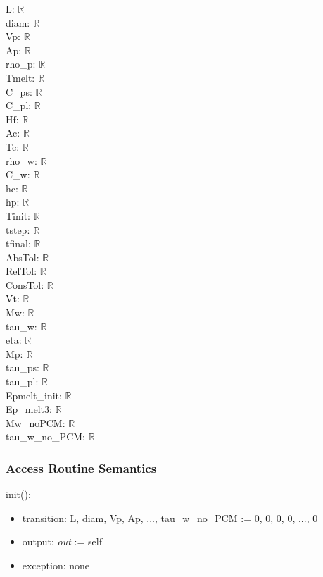 \documentclass[12pt]{article}
\begin{document}
L: $\mathbb{R}$ \\
diam: $\mathbb{R}$ \\
Vp: $\mathbb{R}$ \\
Ap: $\mathbb{R}$ \\
rho\_p: $\mathbb{R}$ \\
Tmelt: $\mathbb{R}$ \\
C\_ps: $\mathbb{R}$ \\
C\_pl: $\mathbb{R}$ \\
Hf: $\mathbb{R}$ \\
Ac: $\mathbb{R}$ \\
Tc: $\mathbb{R}$ \\
rho\_w: $\mathbb{R}$ \\
C\_w: $\mathbb{R}$ \\
hc: $\mathbb{R}$ \\
hp: $\mathbb{R}$ \\
Tinit: $\mathbb{R}$ \\
tstep: $\mathbb{R}$ \\
tfinal: $\mathbb{R}$ \\
AbsTol: $\mathbb{R}$ \\
RelTol: $\mathbb{R}$ \\
ConsTol: $\mathbb{R}$ \\
Vt: $\mathbb{R}$ \\
Mw: $\mathbb{R}$ \\
tau\_w: $\mathbb{R}$ \\
eta: $\mathbb{R}$ \\
Mp: $\mathbb{R}$ \\
tau\_ps: $\mathbb{R}$ \\
tau\_pl: $\mathbb{R}$ \\
Epmelt\_init: $\mathbb{R}$ \\
Ep\_melt3: $\mathbb{R}$ \\ 
Mw\_noPCM: $\mathbb{R}$ \\
tau\_w\_no\_PCM: $\mathbb{R}$

\subsubsection{Access Routine Semantics}

\noindent init():
\begin{itemize}
\item transition: L, diam,  Vp, Ap, ..., tau\_w\_no\_PCM := 0, 0, 0, 0, ..., 0
\item output: \textit{out} := self
\item exception: none
\end{itemize}
\end{document}
